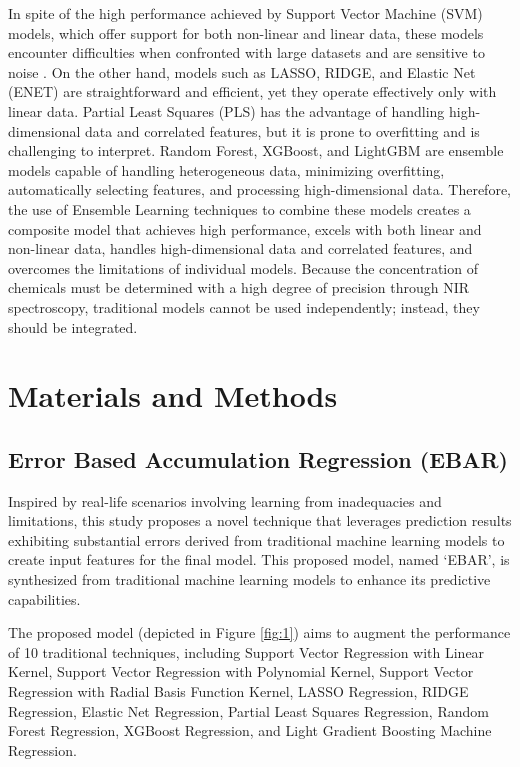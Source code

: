 \documentclass[10pt, a4paper, oneside]{article}
\begin{document}
In spite of the high performance achieved by Support Vector Machine (SVM) models, which offer support for both non-linear and linear data, these models encounter difficulties when confronted with large datasets and are sensitive to noise \cite{ngo2022deep}. On the other hand, models such as LASSO, RIDGE, and Elastic Net (ENET) are straightforward and efficient, yet they operate effectively only with linear data. Partial Least Squares (PLS) has the advantage of handling high-dimensional data and correlated features, but it is prone to overfitting and is challenging to interpret. Random Forest, XGBoost, and LightGBM are ensemble models capable of handling heterogeneous data, minimizing overfitting, automatically selecting features, and processing high-dimensional data. Therefore, the use of Ensemble Learning techniques to combine these models creates a composite model that achieves high performance, excels with both linear and non-linear data, handles high-dimensional data and correlated features, and overcomes the limitations of individual models. Because the concentration of chemicals must be determined with a high degree of precision through NIR spectroscopy, traditional models cannot be used independently; instead, they should be integrated.

\section{Materials and Methods}
\subsection{Error Based Accumulation Regression (EBAR)}
Inspired by real-life scenarios involving learning from inadequacies and limitations, this study proposes a novel technique that leverages prediction results exhibiting substantial errors derived from traditional machine learning models to create input features for the final model. This proposed model, named ‘EBAR’, is synthesized from traditional machine learning models to enhance its predictive capabilities.

The proposed model (depicted in Figure \ref{fig:1}) aims to augment the performance of 10 traditional techniques, including Support Vector Regression with Linear Kernel, Support Vector Regression with Polynomial Kernel, Support Vector Regression with Radial Basis Function Kernel, LASSO Regression, RIDGE Regression, Elastic Net Regression, Partial Least Squares Regression, Random Forest Regression, XGBoost Regression, and Light Gradient Boosting Machine Regression.
\end{document}
